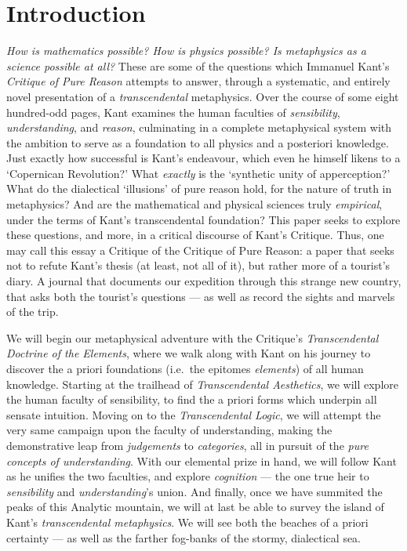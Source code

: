 \section{Introduction}
\emph{How is mathematics possible? How is physics possible? Is metaphysics as a science possible at all?} These are some of the questions which Immanuel Kant's \emph{Critique of Pure Reason} attempts to answer, through a systematic, and entirely novel presentation of a \emph{transcendental} metaphysics. Over the course of some eight hundred-odd pages, Kant examines the human faculties of \emph{sensibility}, \emph{understanding}, and \emph{reason}, culminating in a complete metaphysical system with the ambition to serve as a foundation to all physics and a posteriori knowledge. Just exactly how successful is Kant's endeavour, which even he himself likens to a \enquote*{Copernican Revolution?} What \emph{exactly} is the \enquote*{synthetic unity of apperception?} What do the dialectical \enquote*{illusions} of pure reason hold, for the nature of truth in metaphysics? And are the mathematical and physical sciences truly \emph{empirical}, under the terms of Kant's transcendental foundation? This paper seeks to explore these questions, and more, in a critical discourse of Kant's Critique. Thus, one may call this essay a Critique of the Critique of Pure Reason: a paper that seeks not to refute Kant's thesis (at least, not all of it), but rather more of a tourist's diary. A journal that documents our expedition through this strange new country, that asks both the tourist's questions --- as well as record the sights and marvels of the trip.

We will begin our metaphysical adventure with the Critique's \emph{Transcendental Doctrine of the Elements}, where we walk along with Kant on his journey to discover the a priori foundations (i.e.\ the epitomes \emph{elements}) of all human knowledge. Starting at the trailhead of \emph{Transcendental Aesthetics}, we will explore the human faculty of sensibility, to find the a priori forms which underpin all sensate intuition. Moving on to the \emph{Transcendental Logic}, we will attempt the very same campaign upon the faculty of understanding, making the demonstrative leap from \emph{judgements} to \emph{categories}, all in pursuit of the \emph{pure concepts of understanding}. With our elemental prize in hand, we will follow Kant as he unifies the two faculties, and explore \emph{cognition} --- the one true heir to \emph{sensibility} and \emph{understanding}'s union. And finally, once we have summited the peaks of this Analytic mountain, we will at last be able to survey the island of Kant's \emph{transcendental metaphysics}. We will see both the beaches of a priori certainty --- as well as the farther fog-banks of the stormy, dialectical sea.
